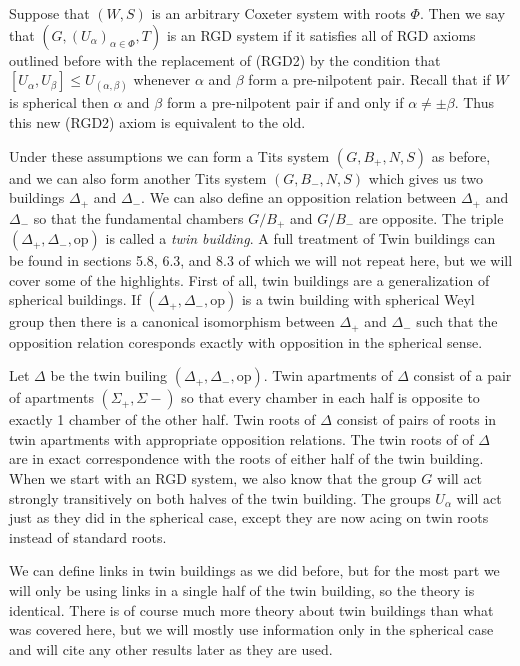 \documentclass[class=book, crop=false,12 pt]{standalone}
\begin{document}
Suppose that $(W,S)$ is an arbitrary Coxeter system with roots $\Phi.$ Then we say that $(G,(U_\alpha)_{\alpha\in \Phi},T)$ is an RGD system if it satisfies all of RGD axioms outlined before with the replacement of (RGD2) by the condition that $[U_\alpha,U_\beta]\le U_{(\alpha,\beta)}$ whenever $\alpha$ and $\beta$ form a pre-nilpotent pair. Recall that if $W$ is spherical then $\alpha$ and $\beta$ form a pre-nilpotent pair if and only if $\alpha\neq \pm \beta.$ Thus this new (RGD2) axiom is equivalent to the old. 

Under these assumptions we can form a Tits system $(G,B_+,N,S)$ as before, and we can also form another Tits system $(G,B_-,N,S)$ which gives us two buildings $\Delta_+$ and $\Delta_-.$ We can also define an opposition relation between $\Delta_+$ and $\Delta_-$ so that the fundamental chambers $G/B_+$ and $G/B_-$ are opposite. The triple $(\Delta_+,\Delta_-,\mathrm{op})$ is called a \emph{twin building}. A full treatment of Twin buildings can be found in sections 5.8, 6.3, and 8.3 of \cite{buildings} which we will not repeat here, but we will cover some of the highlights. First of all, twin buildings are a generalization of spherical buildings. If $(\Delta_+,\Delta_-,\mathrm{op})$ is a twin building with spherical Weyl group then there is a canonical isomorphism between $\Delta_+$ and $\Delta_-$ such that the opposition relation coresponds exactly with opposition in the spherical sense.

Let $\Delta$ be the twin builing $(\Delta_+,\Delta_-,\mathrm{op}).$ Twin apartments of $\Delta$ consist of a pair of apartments $(\Sigma_+,\Sigma-)$ so that every chamber in each half is opposite to exactly 1 chamber of the other half. Twin roots of $\Delta$ consist of pairs of roots in twin apartments with appropriate opposition relations. The twin roots of of $\Delta$ are in exact correspondence with the roots of either half of the twin building. When we start with an RGD system, we also know that the group $G$ will act strongly transitively on both halves of the twin building. The groups $U_\alpha$ will act just as they did in the spherical case, except they are now acing on twin roots instead of standard roots.

We can define links in twin buildings as we did before, but for the most part we will only be using links in a single half of the twin building, so the theory is identical. There is of course much more theory about twin buildings than what was covered here, but we will mostly use information only in the spherical case and will cite any other results later as they are used.
\end{document}
